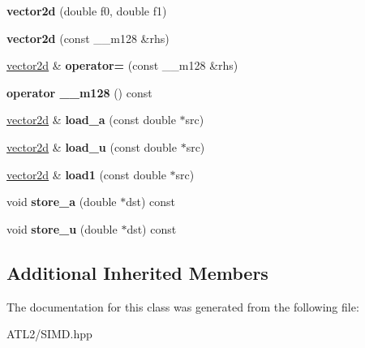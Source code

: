 \begin{DoxyCompactItemize}
\item 
\hypertarget{classsimd_1_1vector2d_a6bb8da073bec335551b009a92b7836e2}{{\bfseries vector2d} (double f0, double f1)}\label{classsimd_1_1vector2d_a6bb8da073bec335551b009a92b7836e2}

\item 
\hypertarget{classsimd_1_1vector2d_af5018df52051248f830d1d763733bd10}{{\bfseries vector2d} (const \+\_\+\+\_\+m128 \&rhs)}\label{classsimd_1_1vector2d_af5018df52051248f830d1d763733bd10}

\item 
\hypertarget{classsimd_1_1vector2d_ae0f759e6c5ad3236b64324883ef56362}{\hyperlink{classsimd_1_1vector2d}{vector2d} \& {\bfseries operator=} (const \+\_\+\+\_\+m128 \&rhs)}\label{classsimd_1_1vector2d_ae0f759e6c5ad3236b64324883ef56362}

\item 
\hypertarget{classsimd_1_1vector2d_a6d9c6d2fdcfd79caed0e0ca4ba6c4193}{{\bfseries operator \+\_\+\+\_\+m128} () const }\label{classsimd_1_1vector2d_a6d9c6d2fdcfd79caed0e0ca4ba6c4193}

\item 
\hypertarget{classsimd_1_1vector2d_a48343c3ce199a62c94a3628f4a9b8356}{\hyperlink{classsimd_1_1vector2d}{vector2d} \& {\bfseries load\+\_\+a} (const double $\ast$src)}\label{classsimd_1_1vector2d_a48343c3ce199a62c94a3628f4a9b8356}

\item 
\hypertarget{classsimd_1_1vector2d_aef41f161d484e293b5ed6f041cabc362}{\hyperlink{classsimd_1_1vector2d}{vector2d} \& {\bfseries load\+\_\+u} (const double $\ast$src)}\label{classsimd_1_1vector2d_aef41f161d484e293b5ed6f041cabc362}

\item 
\hypertarget{classsimd_1_1vector2d_a0a14c4aada433909e34e2f86bf26cdd4}{\hyperlink{classsimd_1_1vector2d}{vector2d} \& {\bfseries load1} (const double $\ast$src)}\label{classsimd_1_1vector2d_a0a14c4aada433909e34e2f86bf26cdd4}

\item 
\hypertarget{classsimd_1_1vector2d_ac7f65ddb8522ad00471574e00be3f0fe}{void {\bfseries store\+\_\+a} (double $\ast$dst) const }\label{classsimd_1_1vector2d_ac7f65ddb8522ad00471574e00be3f0fe}

\item 
\hypertarget{classsimd_1_1vector2d_a447736062fd8f0edd65db761cbe9a0fc}{void {\bfseries store\+\_\+u} (double $\ast$dst) const }\label{classsimd_1_1vector2d_a447736062fd8f0edd65db761cbe9a0fc}

\end{DoxyCompactItemize}
\subsection*{Additional Inherited Members}


The documentation for this class was generated from the following file\+:\begin{DoxyCompactItemize}
\item 
A\+T\+L2/S\+I\+M\+D.\+hpp\end{DoxyCompactItemize}
